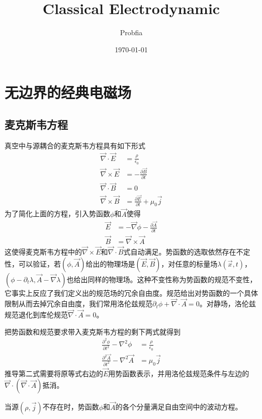 \documentclass[a4paper,11pt]{ctexart}
\title{Classical Electrodynamic}
\author{Probfia}
\date{\today}
\newcommand{\bea}{\begin{equation}\begin{aligned}}
\newcommand{\eea}{\end{aligned}\end{equation}}
\newcommand{\del}{\vec{\nabla}}
\newcommand{\epv}{\epsilon_0}
\newcommand{\pfrac}[2]{\frac{\partial #1}{\partial #2}}
\begin{document}
\maketitle
\tableofcontents



\section{无边界的经典电磁场}
\subsection{麦克斯韦方程}
真空中与源耦合的麦克斯韦方程具有如下形式
\bea \label{maxeq}
\del \cdot \vec{E} &= \frac{\rho}{\epv} \\
\del \times \vec{E} &= -\pfrac{\vec{B}}{t} \\
\del \cdot \vec{B} &= 0 \\ 
\del \times \vec{B} &= \pfrac{\vec{E}}{t}+ \mu_0 \vec{j}
\eea
为了简化上面的方程，引入势函数$\phi$和$\vec{A}$使得
\bea
\vec{E} &= -\del \phi - \pfrac{\vec{A}}{t} \\
\vec{B} & = \del \times \vec{A}
\eea
这使得麦克斯韦方程中的$\del \times \vec{E}$和$\del \cdot \vec{B}$式自动满足。势函数的选取依然存在不定性，可以验证，若$(\phi,\vec A)$给出的物理场是$( \vec E , \vec B )$，对任意的标量场$\lambda (\vec{x},t)$，$(\phi -\partial_t \lambda, \vec A - \del \lambda )$也给出同样的物理场。这种不变性称为势函数的规范不变性，它事实上反应了我们定义出的规范场的冗余自由度。规范给出对势函数的一个具体限制从而去掉冗余自由度，我们常用洛伦兹规范$\partial_t \phi + \del \cdot \vec A = 0$。对静场，洛伦兹规范退化到库伦规范$\del \cdot \vec A = 0$。
\par
把势函数和规范要求带入麦克斯韦方程的剩下两式就得到
\bea \label{maxpot}
\frac{\partial^2 \phi}{\partial t^2} - \nabla^2 \phi &= \frac{\rho }{\epv} \\
\frac{\partial^2 \vec A}{\partial t^2} - \nabla^2 \vec A &= \mu_0 \vec j 
\eea
推导第二式需要将原等式右边的$\vec E$用势函数表示，并用洛伦兹规范条件与左边的$\del \cdot ( \del \cdot \vec A)$抵消。
\par
当源$(\rho, \vec j )$不存在时，势函数$\phi$和$\vec A$的各个分量满足自由空间中的波动方程。
\end{document}
